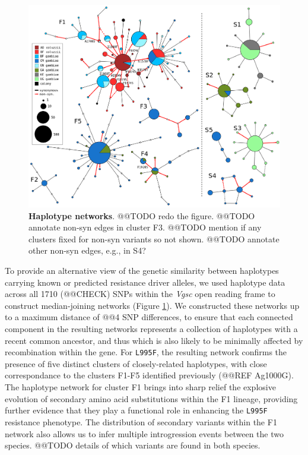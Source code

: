 \documentclass[a4paper,11pt,abstracton]{scrartcl}
\begin{document}
\begin{figure}[!b]
  \includegraphics[width=1.1\linewidth,center]{artwork/fig_networks.png}
  \caption{\textbf{Haplotype networks}. @@TODO redo the figure. @@TODO annotate non-syn edges in cluster F3. @@TODO mention if any clusters fixed for non-syn variants so not shown. @@TODO annotate other non-syn edges, e.g., in S4?}
  \label{fig:networks}
\end{figure}


To provide an alternative view of the genetic similarity between haplotypes carrying known or predicted resistance driver alleles, we used haplotype data across all 1710 (@@CHECK) SNPs within the \textit{Vgsc} open reading frame to construct median-joining networks (Figure \ref{fig:networks}).
%
We constructed these networks up to a maximum distance of @@4 SNP differences, to ensure that each connected component in the resulting networks represents a collection of haplotypes with a recent common ancestor, and thus which is also likely to be minimally affected by recombination within the gene.
%
For \texttt{L995F}, the resulting network confirms the presence of five distinct clusters of closely-related haplotypes, with close correspondance to the clusters F1-F5 identified previously (@@REF Ag1000G).
%
The haplotype network for cluster F1 brings into sharp relief the explosive evolution of secondary amino acid substitutions within the F1 lineage, providing further evidence that they play a functional role in enhancing the \texttt{L995F} resistance phenotype.
%
The distribution of secondary variants within the F1 network also allows us to infer multiple introgression events between the two species.
%
@@TODO details of which variants are found in both species.
\end{document}
